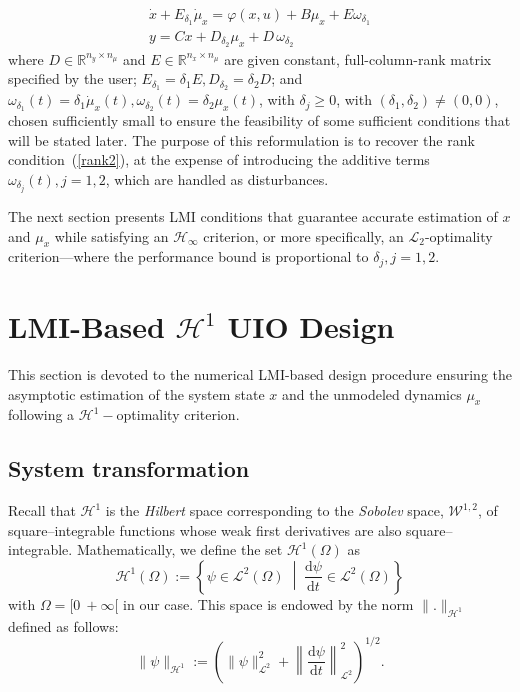 \documentclass{ifacconf}
\def\eqref#1{(\ref{#1})}
\begin{document}
\begin{equation}\label{ali_syst1}
    \begin{array}{l}
        \dot{x} + E_{\delta_1} \dot{\mu}_{x} = \varphi(x,u) + B\mu_{x} + E \omega_{\delta_{1}} \\
        y = Cx + D_{\delta_2} \mu_{x} + D\, \omega_{\delta_{2}} 
    \end{array}
\end{equation}
where $D \in \mathbb{R}^{n_y \times n_{\mu}}$ and $E \in \mathbb{R}^{n_x \times n_{\mu}}$ are given constant, full-column-rank matrix specified by the user; $E_{\delta_1} = \delta_{1} E, D_{\delta_2} = \delta_{2} D$; and $\omega_{\delta_{1}}(t) = \delta_{1} \dot{\mu}_{x}(t), \omega_{\delta_{2}}(t) = \delta_{2} \mu_{x}(t)$, with $\delta_{j} \geq 0$, with $(\delta_1,\delta_2) \neq (0,0)$, chosen sufficiently small to ensure the feasibility of some sufficient conditions that will be stated later. The purpose of this reformulation is to recover the rank condition~\eqref{rank2}, at the expense of introducing the additive terms $\omega_{\delta_{j}}(t), j=1,2$, which are handled as disturbances. 

The next section presents LMI conditions that guarantee accurate estimation of $x$ and $\mu_{x}$ while satisfying an $\mathcal{H}_{\infty}$ criterion, or more specifically, an $\mathcal{L}_{2}$-optimality criterion---where the performance bound is proportional to $\delta_{j}, j=1,2$.








\section{LMI-Based $\mathcal{H}^{1}$ UIO Design}\label{uio}
This section is devoted to the numerical LMI-based design procedure ensuring the asymptotic estimation of the system state $x$ and the unmodeled dynamics $\mu_{x}$ following a $\mathcal{H}^{1}-$optimality criterion.

\subsection{System transformation}
Recall that $\mathcal{H}^{1}$ is the {\it Hilbert} space corresponding to the {\it Sobolev} space, $\mathcal{W}^{1,2}$, of square--integrable functions whose weak first derivatives are also square--integrable. Mathematically, we define the set $\mathcal{H}^{1}\left( \Omega \right)$ as
$$
\mathcal{H}^{1}\left( \Omega \right) := \left\{ \psi \in \mathcal{L}^{2}(\Omega) \;\middle|\; \frac{\textrm{d} \psi}{\textrm{d} t} \in \mathcal{L}^{2}(\Omega) \right\}
$$
with $\Omega = [0~+\infty[$ in our case. This space is endowed by the norm $\| . \|_{\mathcal{H}^{1}}$ defined as follows:
$$
\| \psi \|_{\mathcal{H}^{1}} :=
\left( \| \psi \|_{\mathcal{L}^{2}}^2 + \left\| \frac{\textrm{d} \psi}{\textrm{d} t} \right\|_{\mathcal{L}^{2}}^2 \right)^{1/2}.
$$
\end{document}
